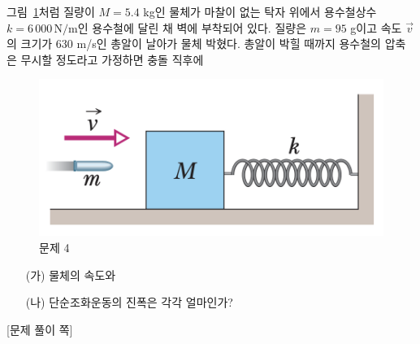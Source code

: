 \documentclass[floatfix,nofootinbib,superscriptaddress,fleqn,preprint]{revtex4-2}
\begin{document}
그림~\ref{fig:3}처럼 질량이 $M=5.4$ kg인 물체가 마찰이 없는 탁자
위에서 용수철상수 $k=6\,000\,\mathrm{N/m}$인 용수철에 달린 채 벽에
부착되어 있다. 질량은 $m=95$ g이고 속도 $\vec{v}$의 크기가 630 m/s인
총알이 날아가 물체 박혔다. 총알이 박힐 때까지 용수철의 압축은 무시할
정도라고 가정하면 충돌 직후에
\begin{figure}[ht]
  \centering
\includegraphics[scale=0.35]{Qfig18-3-20220511.png}
  \caption{문제 4}
  \label{fig:3}
\end{figure}
\begin{itemize}
\item[(가)] 물체의 속도와 
\item[(나)] 단순조화운동의 진폭은 각각 얼마인가?
\end{itemize}
\newpage
{\color{gray} [문제 풀이 쪽]}

\newpage
\end{document}
